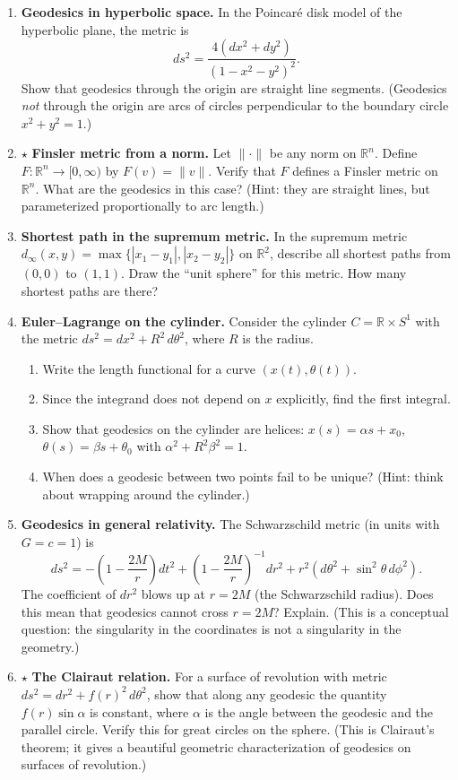 \begin{enumerate}
    \item \textbf{Geodesics in hyperbolic space.} In the Poincar\'e disk model of the hyperbolic plane, the metric is
    \[
        ds^2 = \frac{4(dx^2 + dy^2)}{(1 - x^2 - y^2)^2}.
    \]
    Show that geodesics through the origin are straight line segments. (Geodesics \emph{not} through the origin are arcs of circles perpendicular to the boundary circle $x^2 + y^2 = 1$.)

    \item $\star$ \textbf{Finsler metric from a norm.} Let $\|\cdot\|$ be any norm on $\mathbb{R}^n$. Define $F : \mathbb{R}^n \to [0,\infty)$ by $F(v) = \|v\|$. Verify that $F$ defines a Finsler metric on $\mathbb{R}^n$. What are the geodesics in this case? (Hint: they are straight lines, but parameterized proportionally to arc length.)

    \item \textbf{Shortest path in the supremum metric.} In the supremum metric $d_\infty(x,y) = \max\{|x_1-y_1|,|x_2-y_2|\}$ on $\mathbb{R}^2$, describe all shortest paths from $(0,0)$ to $(1,1)$. Draw the ``unit sphere'' for this metric. How many shortest paths are there?

    \item \textbf{Euler--Lagrange on the cylinder.} Consider the cylinder $C = \mathbb{R} \times S^1$ with the metric $ds^2 = dx^2 + R^2\,d\theta^2$, where $R$ is the radius.
    \begin{enumerate}
        \item Write the length functional for a curve $(x(t), \theta(t))$.
        \item Since the integrand does not depend on $x$ explicitly, find the first integral.
        \item Show that geodesics on the cylinder are helices: $x(s) = \alpha s + x_0$, $\theta(s) = \beta s + \theta_0$ with $\alpha^2 + R^2\beta^2 = 1$.
        \item When does a geodesic between two points fail to be unique? (Hint: think about wrapping around the cylinder.)
    \end{enumerate}

    \item \textbf{Geodesics in general relativity.} The Schwarzschild metric (in units with $G=c=1$) is
    \[
    ds^2 = -\left(1-\frac{2M}{r}\right)dt^2 + \left(1-\frac{2M}{r}\right)^{-1}dr^2 + r^2(d\theta^2 + \sin^2\theta\,d\phi^2).
    \]
    The coefficient of $dr^2$ blows up at $r = 2M$ (the Schwarzschild radius). Does this mean that geodesics cannot cross $r = 2M$? Explain. (This is a conceptual question: the singularity in the coordinates is not a singularity in the geometry.)

    \item $\star$ \textbf{The Clairaut relation.} For a surface of revolution with metric $ds^2 = dr^2 + f(r)^2\,d\theta^2$, show that along any geodesic the quantity $f(r)\sin\alpha$ is constant, where $\alpha$ is the angle between the geodesic and the parallel circle. Verify this for great circles on the sphere. (This is Clairaut's theorem; it gives a beautiful geometric characterization of geodesics on surfaces of revolution.)

\end{enumerate}
